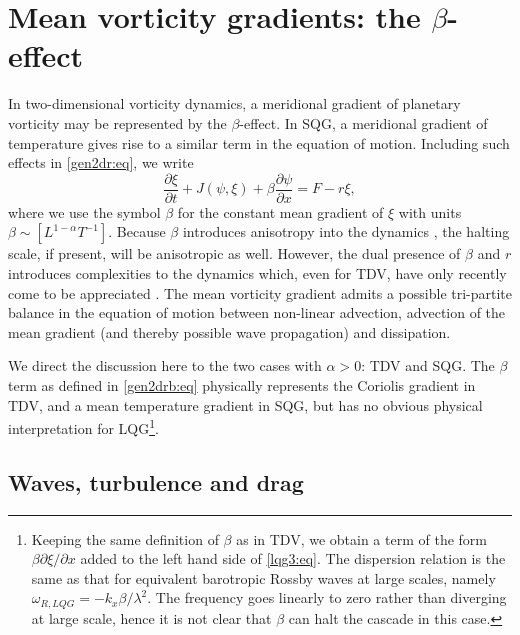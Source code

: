 \documentclass{jfm}
\newcommand{\p}   {\partial}
\newcommand{\pp}  [2]{\frac{\p #1}{\p #2}}
\begin{document}
\section{Mean vorticity gradients:  the $\beta$-effect}
\label{beta:sec}

In two-dimensional vorticity dynamics, a meridional gradient of
planetary vorticity may be represented by the $\beta$-effect. In
SQG, a meridional gradient of temperature gives rise to a similar
term in the equation of motion. Including such effects in
\eqref{gen2dr:eq}, we write
\begin{equation}
\pp{\xi}{t} + J(\psi,\xi) +\beta\pp{\psi}{x} = F-r\xi,
\label{gen2drb:eq}
\end{equation}
where we use the symbol $\beta$ for the constant mean gradient of
$\xi$ with units $\beta \sim [L^{1-\alpha}T^{-1}]$.  Because $\beta$
introduces anisotropy into the dynamics \citep{Rhines75,Vallis93a},
the halting scale, if present, will be anisotropic as well. However,
the dual presence of $\beta$ and $r$ introduces complexities to the
dynamics which, even for TDV, have only recently come to be
appreciated
\citep{chekhlov96,manfroi99,smithwaleffe99,huang01,galperin01,danilov01b}. The
mean vorticity gradient admits a possible tri-partite balance in the
equation of motion between non-linear advection, advection of the mean
gradient (and thereby possible wave propagation) and dissipation.

We direct the discussion here to the two cases with $\alpha>0$: TDV
and SQG.  The $\beta$ term as defined in \eqref{gen2drb:eq} physically
represents the Coriolis gradient in TDV, and a mean temperature
gradient in SQG, but has no obvious physical interpretation for
LQG\footnote{Keeping the same definition of $\beta$ as in TDV, we
obtain a term of the form $\beta\partial{\xi}/\partial{x}$ added to
the left hand side of \eqref{lqg3:eq}. The dispersion relation is the
same as that for equivalent barotropic Rossby waves at large scales,
namely \(\omega_{R,LQG} = -k_x\beta/\lambda^2.\) The frequency goes
linearly to zero rather than diverging at large scale, hence it is not
clear that $\beta$ can halt the cascade in this case.}.

\subsection{Waves, turbulence and drag}
\end{document}
